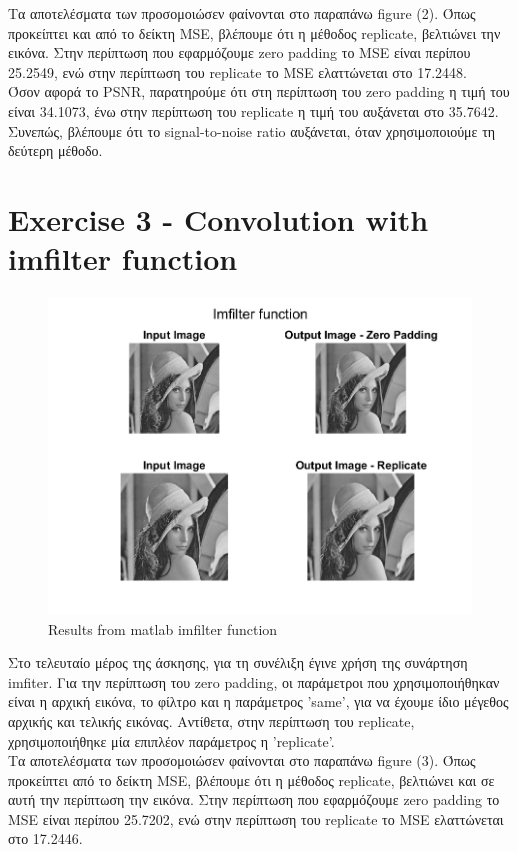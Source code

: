 \documentclass{article}
\begin{document}
	\noindent	
	Τα αποτελέσματα των προσομοιώσεν φαίνονται στο παραπάνω figure (2). Όπως προκείπτει και από το δείκτη MSE, βλέπουμε ότι η μέθοδος replicate, βελτιώνει την εικόνα. Στην περίπτωση που εφαρμόζουμε zero padding το MSE είναι περίπου 25.2549, ενώ στην περίπτωση του replicate το MSE ελαττώνεται στο 17.2448.\\
	
	\noindent
	Όσον αφορά το PSNR, παρατηρούμε ότι στη περίπτωση του zero padding η τιμή του είναι 34.1073, ένω στην περίπτωση του replicate η τιμή του αυξάνεται στο 35.7642. Συνεπώς, βλέπουμε ότι το signal-to-noise ratio αυξάνεται, όταν χρησιμοποιούμε τη δεύτερη μέθοδο.

\section*{Exercise 3 - Convolution with imfilter function}	
	\begin{figure}[h!]
		\centering
		\includegraphics[width=0.8\linewidth]{./output_images/imfilter_func.png}
		\caption{Results from matlab imfilter function}
	\end{figure}
	
	\noindent
	Στο τελευταίο μέρος της άσκησης, για τη συνέλιξη έγινε χρήση της συνάρτηση imfiter. Για την περίπτωση του zero padding, οι παράμετροι που χρησιμοποιήθηκαν είναι η αρχική εικόνα, το φίλτρο και η παράμετρος 'same', για να έχουμε ίδιο μέγεθος αρχικής και τελικής εικόνας. Αντίθετα, στην περίπτωση του replicate, χρησιμοποιήθηκε μία επιπλέον παράμετρος η 'replicate'. \\
	
	\noindent
	Τα αποτελέσματα των προσομοιώσεν φαίνονται στο παραπάνω figure (3). Όπως προκείπτει από το δείκτη MSE, βλέπουμε ότι η μέθοδος replicate, βελτιώνει και σε αυτή την περίπτωση την εικόνα. Στην περίπτωση που εφαρμόζουμε zero padding το MSE είναι περίπου 25.7202, ενώ στην περίπτωση του replicate το MSE ελαττώνεται στο 17.2446.\\
	
\end{document}

